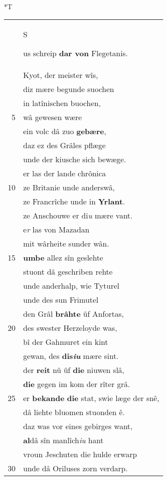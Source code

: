 \documentclass[8pt,a4paper,notitlepage]{article}
\begin{document}
\begin{table}[ht]
\begin{minipage}[t]{0.5\linewidth}
\small
\begin{center}*T
\end{center}
\begin{tabular}{rl}
 & \begin{large}S\end{large}us schreip \textbf{dar von} Flegetanis.\\ 
 & Kyot, der meister wîs,\\ 
 & diz mære begunde suochen\\ 
 & in latînischen buochen,\\ 
5 & wâ gewesen wære\\ 
 & ein volc dâ zuo \textbf{gebære},\\ 
 & daz ez des Grâles pflæge\\ 
 & unde der kiusche sich bewæge.\\ 
 & er las der lande chrônica\\ 
10 & ze Britanie unde anderswâ,\\ 
 & ze Francrîche unde in \textbf{Yrlant}.\\ 
 & ze Anschouwe er di\textit{u} mære vant.\\ 
 & e\textit{r} las von Mazadan\\ 
 & mit wârheite sunder wân.\\ 
15 & \textbf{umbe} allez sîn geslehte\\ 
 & stuont dâ geschriben rehte\\ 
 & unde anderhalp, wie Tyturel\\ 
 & unde des sun Frimutel\\ 
 & den Grâl \textbf{brâhte} ûf Anfortas,\\ 
20 & des swester Herzeloyde was,\\ 
 & bî der Gahmuret ein kint\\ 
 & gewan, des \textbf{dis\textit{iu}} mære sint.\\ 
 & der \textbf{reit} nû ûf \textbf{die} niuwen slâ,\\ 
 & \textbf{die} gegen im kom der rîter grâ.\\ 
25 & er \textbf{bekande} \textbf{die} stat, swie læge der snê,\\ 
 & dâ liehte bluomen stuonden ê.\\ 
 & daz was vor eines gebirges want,\\ 
 & \textbf{al}dâ sîn manlîch\textit{iu} hant\\ 
 & vroun Jeschuten die hulde erwarp\\ 
30 & unde dâ Oriluses zorn verdarp.\\ 

\end{tabular}
\end{minipage}
\end{table}
\end{document}
